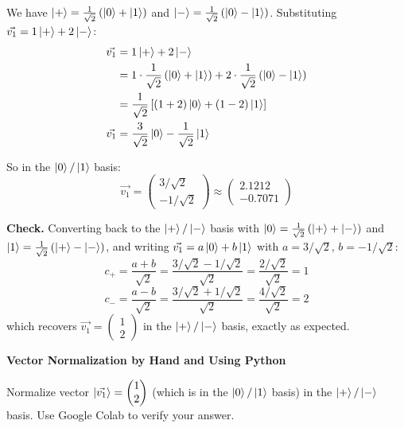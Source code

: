 \documentclass[a4paper, 10pt]{article}
\begin{document}
\begin{solution}
	We have \( \ket{+} = \frac{1}{\sqrt{2}}\left(\ket{0} + \ket{1}\right) \) and \( \ket{-} = \frac{1}{\sqrt{2}}\left(\ket{0} - \ket{1}\right) \).
	Substituting \( \vec{v_1} = 1 \ket{+} + 2 \ket{-} \):
	\begin{align*}
		\vec{v_1} & =  1 \ket{+} + 2 \ket{-}                                                                                    \\
		          & = 1 \cdot \frac{1}{\sqrt{2}}\left(\ket{0} + \ket{1}\right) + 2 \cdot \frac{1}{\sqrt{2}}\left(\ket{0} - \ket{1}\right) \\
		          & = \frac{1}{\sqrt{2}}\left[(1 + 2)\ket{0} + (1 - 2)\ket{1}\right]                                             \\
		\vec{v_1} & = \frac{3}{\sqrt{2}} \ket{0} - \frac{1}{\sqrt{2}} \ket{1}
	\end{align*}

	So in the \( \ket{0}/\ket{1} \) basis:
	\[
		\vec{v_1} = \begin{pmatrix}
			3/\sqrt{2} \\ -1/\sqrt{2}
		\end{pmatrix} \approx \begin{pmatrix}
			2.1212 \\ -0.7071
		\end{pmatrix}
	\]

	\textbf{Check.} Converting back to the \( \ket{+}/\ket{-} \) basis with \( \ket{0} = \frac{1}{\sqrt{2}}\left(\ket{+} + \ket{-}\right) \) and \( \ket{1} = \frac{1}{\sqrt{2}}\left(\ket{+} - \ket{-}\right) \), and writing \( \vec{v_1} = a\ket{0} + b\ket{1} \) with \( a = 3/\sqrt{2},\, b = -1/\sqrt{2} \):
	\[
		c_+ = \frac{a + b}{\sqrt{2}} = \frac{3/\sqrt{2} - 1/\sqrt{2}}{\sqrt{2}} = \frac{2/\sqrt{2}}{\sqrt{2}} = 1
	\]
	\[
		c_- = \frac{a - b}{\sqrt{2}} = \frac{3/\sqrt{2} + 1/\sqrt{2}}{\sqrt{2}} = \frac{4/\sqrt{2}}{\sqrt{2}} = 2
	\]
	which recovers \( \vec{v_1} = \begin{pmatrix} 1 \\ 2 \end{pmatrix} \) in the \( \ket{+}/\ket{-} \) basis, exactly as expected.
\end{solution}

\begin{problem}
\textbf{Vector Normalization by Hand and Using Python}
\par Normalize vector \( \ket{\vec{v_1}} = \begin{pmatrix}
	1 \\ 2
\end{pmatrix} \) (which is in the \( \ket{0}/\ket{1} \) basis) in the \( \ket{+}/\ket{-} \) basis.
Use Google Colab to verify your answer.
\end{problem}
\end{document}
